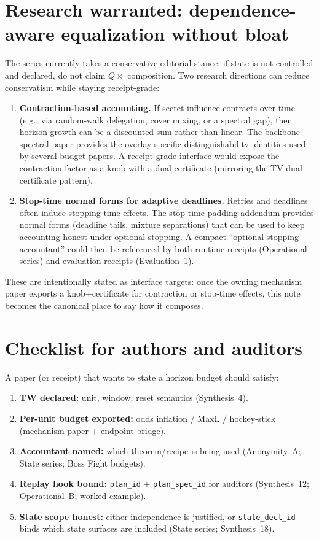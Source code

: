 \documentclass[11pt]{article}
\begin{document}
\section{Research warranted: dependence-aware equalization without bloat}
The series currently takes a conservative editorial stance: if state is not controlled and declared, do not claim $Q\times$ composition.
Two research directions can reduce conservatism while staying receipt-grade:
\begin{enumerate}[leftmargin=*]
\item \textbf{Contraction-based accounting.}
If secret influence contracts over time (e.g., via random-walk delegation, cover mixing, or a spectral gap), then horizon growth can be a discounted sum rather than linear.
The backbone spectral paper provides the overlay-specific distinguishability identities used by several budget papers.\cite{series:spectral}
A receipt-grade interface would expose the contraction factor as a knob with a dual certificate (mirroring the TV dual-certificate pattern).\cite{series:knapsacktransport}
\item \textbf{Stop-time normal forms for adaptive deadlines.}
Retries and deadlines often induce stopping-time effects.
The stop-time padding addendum provides normal forms (deadline tails, mixture separations) that can be used to keep accounting honest under optional stopping.\cite{series:stoptimeaddendum}
A compact ``optional-stopping accountant'' could then be referenced by both runtime receipts (Operational series) and evaluation receipts (Evaluation~1).
\end{enumerate}
These are intentionally stated as interface targets: once the owning mechanism paper exports a knob+certificate for contraction or stop-time effects, this note becomes the canonical place to say how it composes.

\section{Checklist for authors and auditors}
A paper (or receipt) that wants to state a horizon budget should satisfy:
\begin{enumerate}[leftmargin=*]
\item \textbf{TW declared:} unit, window, reset semantics (Synthesis~4).
\item \textbf{Per-unit budget exported:} odds inflation / MaxL / hockey-stick (mechanism paper + endpoint bridge).
\item \textbf{Accountant named:} which theorem/recipe is being used (Anonymity~A; State series; Boss Fight budgets).
\item \textbf{Replay hook bound:} \texttt{plan\_id} + \texttt{plan\_spec\_id} for auditors (Synthesis~12; Operational~B; worked example).
\item \textbf{State scope honest:} either independence is justified, or \texttt{state\_decl\_id} binds which state surfaces are included (State series; Synthesis~18).
\end{enumerate}
\end{document}
